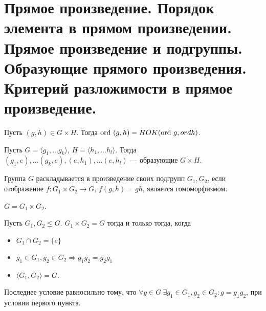 % 
% 
\section{Прямое произведение. Порядок элемента в прямом произведении. Прямое произведение и подгруппы. Образующие прямого произведения. Критерий разложимости в прямое произведение.}
\begin{st}
    Пусть $ (g, h) \in  G\times H$. Тогда $ {\mathop{\text{\rm ord}}}~(g, h) = HOK({\mathop{\text{\rm ord}}}~ g, ord h)$.
\end{st}
\begin{thm}
    Пусть $ G = \langle g_1, \ldots g_k \rangle$, $ H = \langle h_1, \ldots h_l \rangle$. Тогда $ (g_1, e), \ldots (g_k, e), (e, h_1), \ldots (e, h_l)$ --- образующие $ G \times H$.
\end{thm}
\begin{defn}
    Группа $ G$  {\sf раскладывается в произведение своих подгрупп } $ G_1, G_2$, если отображение $ f\colon G_1 \times G_2 \to G$, $ f(g, h) = gh$, является гомоморфизмом.  
    \begin{name}
        $ G = G_1 \times G_2$.
    \end{name}
\end{defn}
\begin{thm}
    Пусть $ G_1 , G_2 \le G$.  $ G_1 \times G_2 = G$ тогда и только тогда, когда 
    \begin{itemize}[noitemsep]
	\item $ G_1\cap G_2 = \{e\} $ 
	\item $ g_1 \in G_1, g_2 \in G_2 \Longrightarrow g_1g_2 = g_2 g_1$
	\item $ \langle G_1, G_2  \rangle = G$.
    \end{itemize}
    \begin{note}
        Последнее условие равносильно тому, что $ \forall g \in G ~ \exists g_1 \in G_1, g_2 \in G_2\colon g = g_1 g_2$, при условии первого пункта.
    \end{note}
\end{thm}
% 
